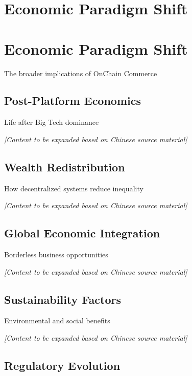 \documentclass[
  Letterpaper,
]{scrbook}
\begin{document}
\chapter{Economic Paradigm Shift}\label{economic-paradigm-shift}

\chapter{Economic Paradigm Shift}\label{sec-paradigm-shift}

The broader implications of OnChain Commerce

\section{Post-Platform Economics}\label{post-platform-economics}

Life after Big Tech dominance

\emph{{[}Content to be expanded based on Chinese source material{]}}

\section{Wealth Redistribution}\label{wealth-redistribution}

How decentralized systems reduce inequality

\emph{{[}Content to be expanded based on Chinese source material{]}}

\section{Global Economic Integration}\label{global-economic-integration}

Borderless business opportunities

\emph{{[}Content to be expanded based on Chinese source material{]}}

\section{Sustainability Factors}\label{sustainability-factors}

Environmental and social benefits

\emph{{[}Content to be expanded based on Chinese source material{]}}

\section{Regulatory Evolution}\label{regulatory-evolution}
\end{document}
